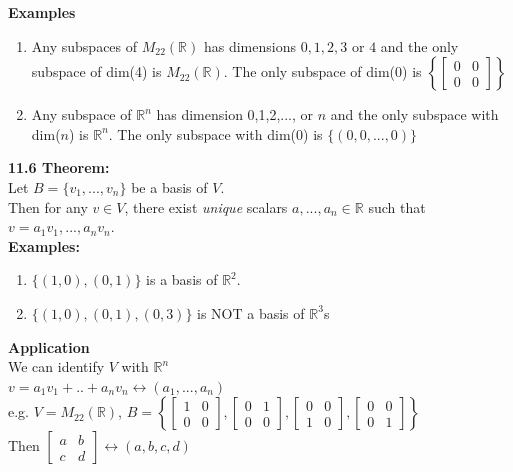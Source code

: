 \documentclass[]{article}
\begin{document}
		{\bf Examples}
		\begin{enumerate}
			\item Any subspaces of $M_{22}(\mathbb{R})$ has dimensions $0,1,2,3$ or $4$ and the only subspace of dim(4) is $M_{22}(\mathbb{R})$. The only subspace of dim(0) is $\left\{\begin{bmatrix}{0}&{0}\\{0}&{0}\end{bmatrix}\right\}$
			\item Any subspace of $\mathbb{R}^n$ has dimension 0,1,2,..., or $n$ and the only subspace with dim($n$) is $\mathbb{R}^n$. The only subspace with dim(0) is $\{(0,0,...,0)\}$
		\end{enumerate}
		\large{\bf 11.6 Theorem:}\\
		\normalsize
		Let $B=\{v_1,...,v_n\}$ be a basis of $V$.\\
		Then for any $v\in V$, there exist \emph{unique} scalars $a,...,a_n\in\mathbb{R}$ such that $v=a_1v_1,...,a_nv_n$.\\
		{\bf Examples:}
		\begin{enumerate}
			\item $\{(1,0),(0,1)\}$ is a basis of $\mathbb{R}^2$.
			\item $\{(1,0),(0,1),(0,3)\}$ is NOT a basis of $\mathbb{R}^3$s
		\end{enumerate}
		{\bf Application}\\
		We can identify $V$ with $\mathbb{R}^n$\\
		$v=a_1v_1+..+a_nv_n\longleftrightarrow(a_1,...,a_n)$\\
		e.g. $V=M_{22}(\mathbb{R})$, $B=\left\{\begin{bmatrix}{1}&{0}\\{0}&{0}\end{bmatrix},\begin{bmatrix}{0}&{1}\\{0}&{0}\end{bmatrix},\begin{bmatrix}{0}&{0}\\{1}&{0}\end{bmatrix},\begin{bmatrix}{0}&{0}\\{0}&{1}\end{bmatrix}\right\}$\\
		Then $\begin{bmatrix}{a}&{b}\\{c}&{d}\end{bmatrix}\longleftrightarrow(a,b,c,d)$
\end{document}

